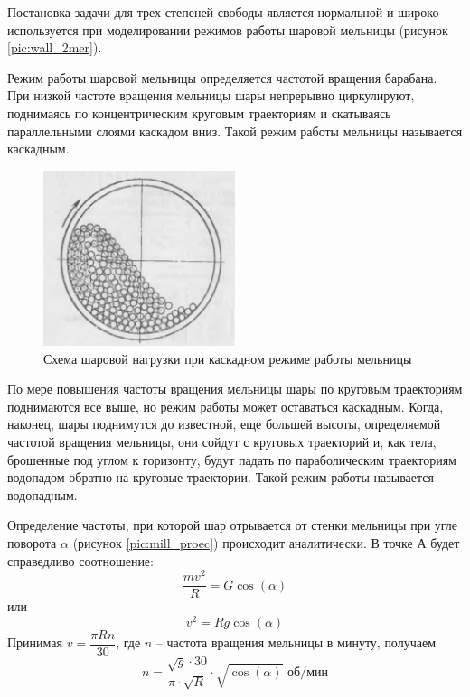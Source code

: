 \documentclass[utf8x, 14pt, oneside, a4paper]{article}
\begin{document}
Постановка задачи для трех степеней свободы является нормальной и широко используется при моделировании режимов работы шаровой мельницы (рисунок \ref{pic:wall_2mer}).

Режим работы шаровой мельницы определяется частотой вращения барабана.
При низкой частоте вращения мельницы шары непрерывно циркулируют, поднимаясь по концентрическим круговым траекториям и скатываясь параллельными слоями каскадом вниз.
Такой режим работы мельницы называется каскадным.

\begin{figure}[H]
	\centering
	\includegraphics[width=0.5\textwidth]{kaskad_theory} 
	\caption{Схема шаровой нагрузки при каскадном режиме работы мельницы}
	\label{pic:kaskad_theory}
\end{figure} 

По мере повышения частоты вращения мельницы шары по круговым траекториям поднимаются все выше, но режим работы может оставаться каскадным.
Когда, наконец, шары поднимутся до известной, еще большей высоты, определяемой частотой вращения мельницы, они сойдут с круговых траекторий и, как тела, брошенные под углом к горизонту, будут падать по параболическим траекториям водопадом обратно на круговые траектории.
Такой режим работы называется водопадным.

Определение частоты, при которой шар отрывается от стенки мельницы при угле поворота $\alpha$ (рисунок \ref{pic:mill_proec}) происходит аналитически.
В точке А будет справедливо соотношение:
\[
\frac{mv^2}{R} = G \cos (\alpha)
\]
или 
\[
v^2 = Rg \cos (\alpha)
\]
Принимая $v = \dfrac{\pi R n}{30}$, где $n$ -- частота вращения мельницы в минуту, получаем
\begin{equation}
n = \frac{\sqrt{g} \cdot 30}{\pi \cdot \sqrt{R}} \cdot \sqrt{\cos (\alpha)} \text{ об/мин}
\end{equation}
\end{document}
